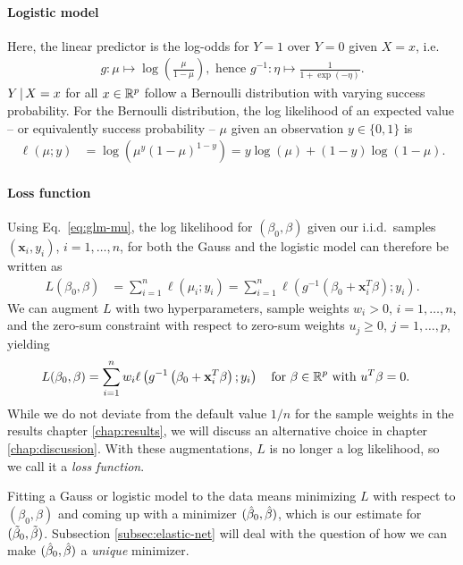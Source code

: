 \paragraph{Logistic model}
Here, the linear predictor is the log-odds for $Y = 1$ over $Y = 0$ given $X = x$, i.e.
\begin{align}
    g: \mu \mapsto \log\left( \frac{\mu}{1 - \mu} \right), \text{ hence } g^{-1}: \eta \mapsto
    \frac{1}{1 + \exp(-\eta)}.
\end{align}
$Y \,|\, X = x$ for all $x \in \mathbb{R}^p$ follow a Bernoulli distribution with varying success 
probability. For the Bernoulli distribution, the log likelihood of an expected value -- or 
equivalently success probability -- $\mu$ given an observation $y \in \{0, 1\}$ is
\begin{align}
    \ell(\mu; y) &= \log\left( \mu^{y} (1 - \mu)^{1 - y} \right) 
    = y \log(\mu) + (1 - y) \log(1 - \mu). 
\end{align}

\paragraph{Loss function}
Using Eq.\ \eqref{eq:glm-mu}, the log likelihood for $(\beta_0, \beta)$ given our i.i.d.\ samples 
$(\mathbf{x}_i, y_i)$, $i = 1, \ldots, n$, for both the Gauss and the logistic model can therefore 
be written as
\begin{align}
    L(\beta_0, \beta) &= \sum_{i=1}^n \ell(\mu_i; y_i) 
    = \sum_{i=1}^n \ell\left( g^{-1}\left( \beta_0 + \mathbf{x}_i^T \beta \right); y_i \right).
\end{align}
We can augment $L$ with two hyperparameters, sample weights $w_i > 0$, $i = 1, \ldots, n$, and the 
zero-sum constraint \cite{zerosum16} with respect to zero-sum weights 
$u_j \geq 0$, $j = 1, \ldots, p$, yielding 
\begin{align} \label{eq:loss-glm-no-lasso}
    L(\beta_0, \beta) &= \sum_{i=1}^n w_i \ell\left( g^{-1}\left( \beta_0 + \mathbf{x}_i^T \beta \right); 
    y_i \right) \quad \text{for } \beta \in \mathbb{R}^p \text{ with } u^T \beta = 0.
\end{align}
While we do not deviate from the default value $1/n$ for the sample weights in the results chapter 
\ref{chap:results}, we will discuss an alternative choice in chapter \ref{chap:discussion}. 
With these augmentations, $L$ is no longer a log likelihood, so we call it a \textit{loss function}.

Fitting a Gauss or logistic model to the data means minimizing $L$ with respect to 
$(\beta_0, \beta)$ and coming up with a minimizer $(\hat{\beta}_0, \hat{\beta})$, which is our estimate for 
$(\tilde{\beta}_0, \tilde{\beta})$. Subsection \ref{subsec:elastic-net} will deal with the question of how we can 
make $(\hat{\beta}_0, \hat{\beta})$ a \textit{unique} minimizer.

